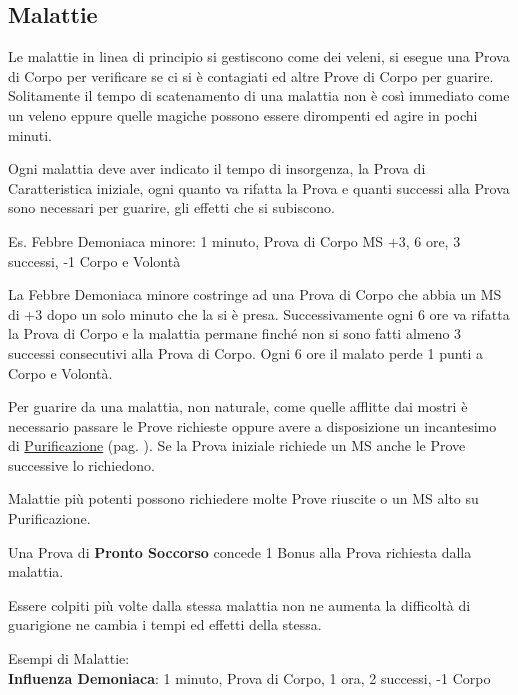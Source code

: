 \documentclass[12pt,a4paper,twoside,openany]{book}
\begin{document}
\medskip

\begin{multicols}{2}


\subsection{Malattie}\hypertarget{malattie}{}\label{malattie}

Le malattie in linea di principio si gestiscono come dei veleni, si esegue una Prova di Corpo per verificare se ci si è contagiati ed altre Prove di Corpo per guarire. 
Solitamente il tempo di scatenamento di una malattia non è così immediato come un veleno eppure quelle magiche possono essere dirompenti ed agire in pochi minuti.

Ogni malattia  deve aver indicato il tempo di insorgenza, la Prova di Caratteristica iniziale, ogni quanto va rifatta la Prova e quanti successi alla Prova sono necessari per guarire, gli effetti che si subiscono.

Es. Febbre Demoniaca minore: 1 minuto, Prova di Corpo MS +3, 6 ore, 3 successi, -1 Corpo e Volontà

La Febbre Demoniaca minore costringe ad una Prova di Corpo che abbia un MS di +3 dopo un solo minuto che la si è presa. Successivamente ogni 6 ore va rifatta la Prova di Corpo e la malattia permane finché non si sono fatti almeno 3 successi consecutivi alla Prova di Corpo. Ogni 6 ore il malato perde 1 punti a Corpo e Volontà.

Per guarire da una malattia, non naturale, come quelle afflitte dai mostri è necessario passare le Prove richieste oppure avere a disposizione un incantesimo di \hyperlink{rimuovimalattie}{Purificazione} (pag. \pageref{Purificazione}). Se la Prova iniziale richiede un MS anche le Prove successive lo richiedono.

Malattie più potenti possono richiedere molte Prove riuscite o un MS alto su Purificazione.

Una Prova di \textbf{Pronto Soccorso} concede 1 Bonus alla Prova richiesta dalla malattia.

Essere colpiti più volte dalla stessa malattia non ne aumenta la difficoltà di guarigione ne cambia i tempi ed effetti della stessa.

Esempi di Malattie:\\

\textbf{Influenza Demoniaca}:  1 minuto, Prova di Corpo, 1 ora, 2 successi, -1 Corpo


\end{multicols}
\end{document}
